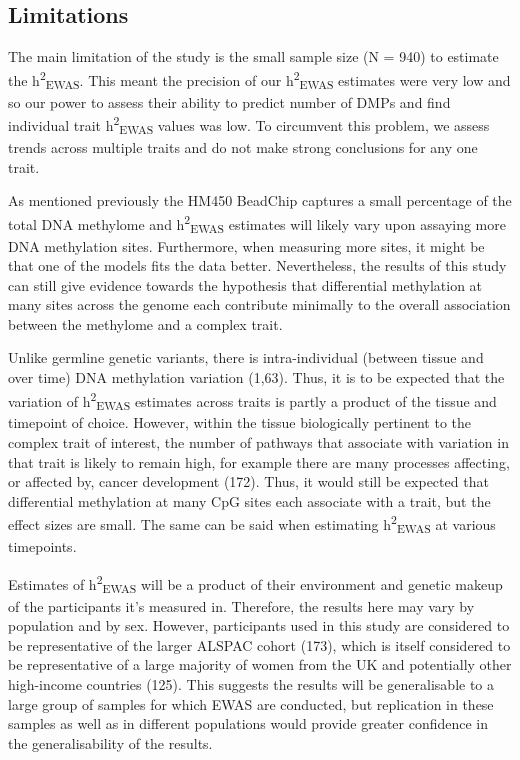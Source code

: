 \documentclass[11pt,oneside]{bristolthesis}
\begin{document}
\hypertarget{limitations-05}{%
\subsection{Limitations}\label{limitations-05}}

The main limitation of the study is the small sample size (N = 940) to estimate the h\textsuperscript{2}\textsubscript{EWAS}. This meant the precision of our h\textsuperscript{2}\textsubscript{EWAS} estimates were very low and so our power to assess their ability to predict number of DMPs and find individual trait h\textsuperscript{2}\textsubscript{EWAS} values was low. To circumvent this problem, we assess trends across multiple traits and do not make strong conclusions for any one trait.

As mentioned previously the HM450 BeadChip captures a small percentage of the total DNA methylome and h\textsuperscript{2}\textsubscript{EWAS} estimates will likely vary upon assaying more DNA methylation sites. Furthermore, when measuring more sites, it might be that one of the models fits the data better. Nevertheless, the results of this study can still give evidence towards the hypothesis that differential methylation at many sites across the genome each contribute minimally to the overall association between the methylome and a complex trait.

Unlike germline genetic variants, there is intra-individual (between tissue and over time) DNA methylation variation (1,63). Thus, it is to be expected that the variation of h\textsuperscript{2}\textsubscript{EWAS} estimates across traits is partly a product of the tissue and timepoint of choice. However, within the tissue biologically pertinent to the complex trait of interest, the number of pathways that associate with variation in that trait is likely to remain high, for example there are many processes affecting, or affected by, cancer development (172). Thus, it would still be expected that differential methylation at many CpG sites each associate with a trait, but the effect sizes are small. The same can be said when estimating h\textsuperscript{2}\textsubscript{EWAS} at various timepoints.

Estimates of h\textsuperscript{2}\textsubscript{EWAS} will be a product of their environment and genetic makeup of the participants it's measured in. Therefore, the results here may vary by population and by sex. However, participants used in this study are considered to be representative of the larger ALSPAC cohort (173), which is itself considered to be representative of a large majority of women from the UK and potentially other high-income countries (125). This suggests the results will be generalisable to a large group of samples for which EWAS are conducted, but replication in these samples as well as in different populations would provide greater confidence in the generalisability of the results.
\end{document}
